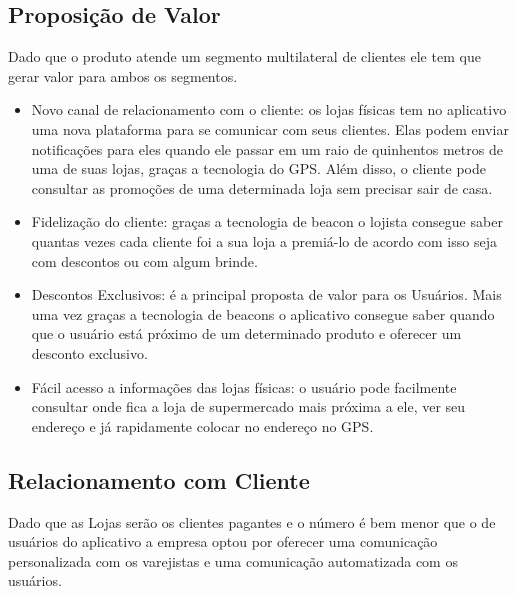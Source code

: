 \subsection{Proposição de Valor}
\label{cha:proposicao_de_valor}
Dado que o produto atende um segmento multilateral de clientes ele tem que gerar valor para ambos os segmentos.
\begin{itemize}
\item Novo canal de relacionamento com o cliente: os lojas físicas tem no aplicativo uma nova plataforma para se comunicar com seus clientes. Elas podem enviar notificações para eles quando ele passar em um raio de quinhentos metros de uma de suas lojas, graças a tecnologia do GPS. Além disso, o cliente pode consultar as promoções de uma determinada loja sem precisar sair de casa.
\item Fidelização do cliente: graças a tecnologia de beacon o lojista consegue saber quantas vezes cada cliente foi a sua loja a premiá-lo de acordo com isso seja com descontos ou com algum brinde.
\item Descontos Exclusivos: é a principal proposta de valor para os Usuários. Mais uma vez graças a tecnologia de beacons o aplicativo consegue saber quando que o usuário está próximo de um determinado produto e oferecer um desconto exclusivo.
\item Fácil acesso a informações das lojas físicas: o usuário pode facilmente consultar onde fica a loja de supermercado mais próxima a ele, ver seu endereço e já rapidamente colocar no endereço no GPS.
\end{itemize}

\subsection{Relacionamento com Cliente}
\label{cha:relacionamento_com_cliente}
Dado que as Lojas serão os clientes pagantes e o número é bem menor que o de usuários do aplicativo a empresa optou por oferecer uma comunicação personalizada com os varejistas e uma comunicação automatizada com os usuários. 

